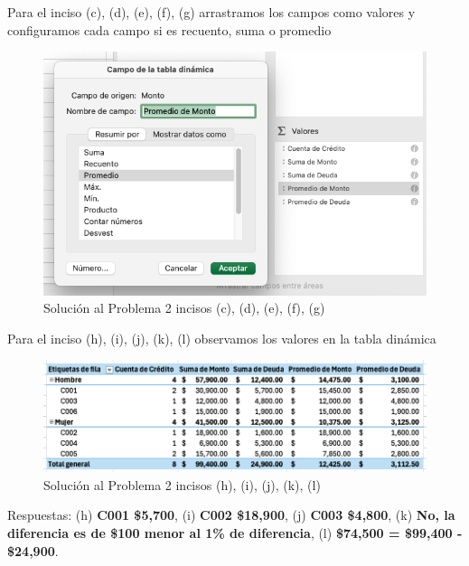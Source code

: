 \documentclass{article}
\begin{document}
\noindent
Para el inciso (c), (d), (e), (f), (g) arrastramos los campos como valores y configuramos cada campo si es recuento, suma o promedio
\begin{figure}[!ht]
    \centering
    \begin{minipage}{\textwidth}
        \centering
        \includegraphics[width=\textwidth]{figures/s102-3.png}
    \end{minipage}
    \captionsetup{width=0.9\textwidth}
    \caption{Solución al Problema 2 incisos (c), (d), (e), (f), (g)}
    \label{fig:s102-3}
\end{figure}

\noindent
Para el inciso (h), (i), (j), (k), (l) observamos los valores en la tabla dinámica
\begin{figure}[!ht]
    \centering
    \begin{minipage}{\textwidth}
        \centering
        \includegraphics[width=\textwidth]{figures/s102-4.png}
    \end{minipage}
    \captionsetup{width=0.9\textwidth}
    \caption{Solución al Problema 2 incisos (h), (i), (j), (k), (l)}
    \label{fig:s102-4}
\end{figure}

\noindent
Respuestas: (h) \textbf{C001 \$5,700}, (i) \textbf{C002 \$18,900}, (j) \textbf{C003 \$4,800}, (k) \textbf{No, la diferencia es de \$100 menor al 1\% de diferencia}, (l) \textbf{\$74,500 = \$99,400 - \$24,900}.
\end{document}
